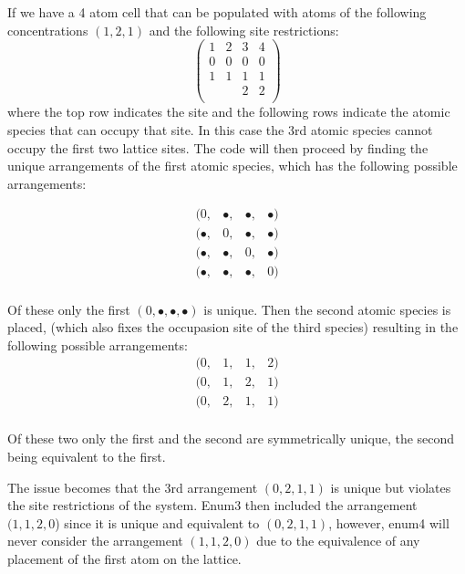 \documentclass{article}
\begin{document}
If we have a 4 atom cell that can be populated with atoms of the
following concentrations $(1,2,1)$ and the following site restrictions:
\begin{equation}
\begin{pmatrix}
  1 & 2 & 3 & 4\\
  0 & 0 & 0 & 0 \\
  1 & 1 & 1 & 1 \\
    &   & 2 & 2 \\
\end{pmatrix}
\end{equation}
where the top row indicates the site and the following rows indicate
the atomic species that can occupy that site. In this case the 3rd
atomic species cannot occupy the first two lattice sites. The code
will then proceed by finding the unique arrangements of the first
atomic species, which has the following possible arrangements:

\begin{equation}
  \begin{matrix}
  (0, & \bullet, & \bullet, & \bullet) \\
  (\bullet, & 0, & \bullet, & \bullet) \\
  (\bullet, & \bullet, & 0, & \bullet) \\
  (\bullet, & \bullet, & \bullet, & 0) \\
  \end{matrix}
\end{equation}

Of these only the first $(0,\bullet,\bullet,\bullet)$ is unique. Then the
second atomic species is placed, (which also fixes the occupasion site
of the third species) resulting in the following possible arrangements:
\begin{equation}
\begin{matrix}
  (0, & 1, & 1, & 2) \\
  (0, & 1, & 2, & 1) \\
  (0, & 2, & 1, & 1) \\
\end{matrix}
\end{equation}

Of these two only the first and the second are symmetrically unique,
the second being equivalent to the first.

The issue becomes that the 3rd arrangement $(0,2,1,1)$ is unique but
violates the site restrictions of the system. Enum3 then included the
arrangement $(1,1,2,0$) since it is unique and equivalent to
$(0,2,1,1)$, however, enum4 will never consider the arrangement
$(1,1,2,0)$ due to the equivalence of any placement of the first atom
on the lattice.
\end{document}
